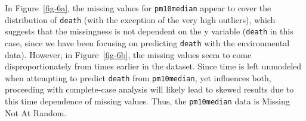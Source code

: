 \documentclass[
  letterpaper,
  DIV=11,
  numbers=noendperiod]{scrartcl}
\begin{document}
In Figure~\ref{fig-6a}, the missing values for \texttt{pm10median}
appear to cover the distribution of \texttt{death} (with the exception
of the very high outliers), which suggests that the missingness is not
dependent on the y variable (\texttt{death} in this case, since we have
been focusing on predicting \texttt{death} with the environmental data).
However, in Figure~\ref{fig-6b}, the missing values seem to come
disproportionately from times earlier in the dataset. Since time is left
unmodeled when attempting to predict \texttt{death} from
\texttt{pm10median}, yet influences both, proceeding with complete-case
analysis will likely lead to skewed results due to this time dependence
of missing values. Thus, the \texttt{pm10median} data is Missing Not At
Random.
\end{document}
